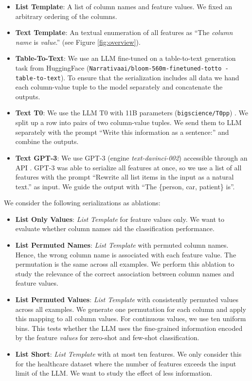\begin{itemize}
    \item \textbf{List Template}: A list of column names and feature values. We fixed an arbitrary ordering of the columns.
    \item \textbf{Text Template}: An textual enumeration of all features as ``The \emph{column name}  is \emph{value}.'' (see Figure \ref{fig:overview}).
    \item \textbf{Table-To-Text}: We use an LLM fine-tuned on a table-to-text generation task from HuggingFace (\texttt{\small Narrativaai/bloom-560m-finetuned-totto -table-to-text}). To ensure that the serialization includes all data we hand each column-value tuple to the model separately and concatenate the outputs.
    \item \textbf{Text T0}: We use the LLM T0 with 11B parameters (\texttt{\small bigscience/T0pp}) \citep{sanh_multitask_2021}. We split up a row into pairs of two column-value tuples. We send them to LLM separately with the prompt ``Write this information as a sentence:'' and combine the outputs.
    \item \textbf{Text GPT-3}: We use GPT-3 (engine \textit{text-davinci-002}) accessible through an API \citep{ouyang_training_2022}. GPT-3 was able to serialize all features at once, so we use a list of all features with the prompt ``Rewrite all list items in the input as a natural text.'' as input. We guide the output with ``The \{person, car, patient\} is''.
    \end{itemize}

We consider the following serializations as ablations:

\begin{itemize}
    \item \textbf{List Only Values}: \emph{List Template} for feature values only. We want to evaluate whether column names aid the classification performance.
    \item \textbf{List Permuted Names}: \emph{List Template} with permuted column names. Hence, the wrong column name is associated with each feature value. The permutation is the same across all examples. We perform this ablation to study the relevance of the correct association between column names and feature values.
    \item \textbf{List Permuted Values}: \emph{List Template} with consistently permuted values across all examples. We generate one permutation for each column and apply this mapping to all column values. For continuous values, we use ten uniform bins. This tests whether the LLM uses the fine-grained information encoded by the feature \emph{values} for zero-shot and few-shot classification.
    \item \textbf{List Short}: \emph{List Template} with at most ten features. We only consider this for the healthcare dataset where the number of features exceeds the input limit of the LLM. We want to study the effect of less information.
\end{itemize}

